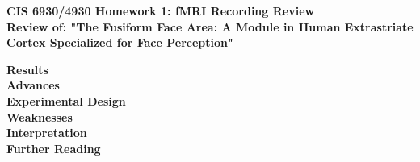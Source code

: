 \documentclass[11pt]{article}
\begin{document}
\begin{center}
{\large {\bf CIS 6930/4930 Homework 1: fMRI Recording Review}}\\
{\normalsize {\bf Review of: "The Fusiform Face Area: A Module in Human Extrastriate Cortex
Specialized for Face Perception"}}
\end{center}

\textbf{Results} \\


\textbf{Advances} \\


\textbf{Experimental Design} \\


\textbf{Weaknesses} \\


\textbf{Interpretation} \\


\textbf{Further Reading} \\
\end{document}
